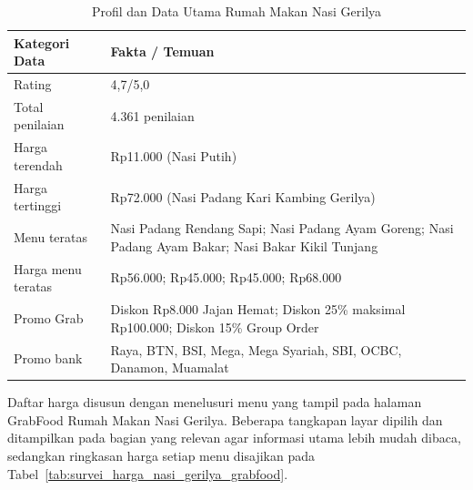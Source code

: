 \begin{table}[!htbp]
    \centering
    \caption{Profil dan Data Utama Rumah Makan Nasi Gerilya}
    \label{tab:data_gerilya}
    \begin{tabularx}{\textwidth}{|J|Y|}
        \toprule
        \textbf{Kategori Data} & \textbf{Fakta / Temuan}                                                                             \\ \hline
        \midrule
        Rating                 & 4,7/5,0                                                                                             \\ \hline
        Total penilaian        & 4.361 penilaian                                                                                     \\ \hline
        Harga terendah         & Rp11.000 (Nasi Putih)                                                                               \\ \hline
        Harga tertinggi        & Rp72.000 (Nasi Padang Kari Kambing Gerilya)                                                         \\ \hline
        Menu teratas           & Nasi Padang Rendang Sapi; Nasi Padang Ayam Goreng; Nasi Padang Ayam Bakar; Nasi Bakar Kikil Tunjang \\ \hline
        Harga menu teratas     & Rp56.000; Rp45.000; Rp45.000; Rp68.000                                                              \\ \hline
        Promo Grab             & Diskon Rp8.000 Jajan Hemat; Diskon 25\% maksimal Rp100.000; Diskon 15\% Group Order                 \\ \hline
        Promo bank             & Raya, BTN, BSI, Mega, Mega Syariah, SBI, OCBC, Danamon, Muamalat                                    \\ \hline
        \bottomrule
    \end{tabularx}
\end{table}

Daftar harga disusun dengan menelusuri menu yang tampil pada halaman GrabFood Rumah Makan Nasi Gerilya. Beberapa tangkapan layar dipilih dan ditampilkan pada bagian yang relevan agar informasi utama lebih mudah dibaca, sedangkan ringkasan harga setiap menu disajikan pada Tabel~\ref{tab:survei_harga_nasi_gerilya_grabfood}.

